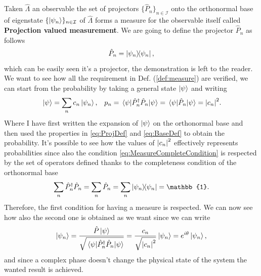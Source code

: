{
    Taken $\hat{\Lambda}$ an observable the set of projectors $\{ \hat{P}_n \}_{n\in\mathcal{I}}$ onto the orthonormal base of eigenstate $\{\ket{\psi_n}\}_{n\in\mathcal{I}}$ of $\hat{\Lambda}$ forms a measure for the observable itself called \textbf{Projection valued measurement}.
}
{
    We are going to define the projector $\hat{P}_n$ as follows
    \begin{equation}
        \hat{P}_n = \ketbra{\psi_n},
    \end{equation}
    which can be easily seen it's a projector, the demonstration is left to the reader. We want to see how all the requirement in Def. (\ref{def:measure}) are verified, we can start from the probability by taking a general state $\ket{\psi}$ and writing
    \begin{align}
        &\ket{\psi} = \sum_n c_n\ket{\psi_n},   & p_n = \ev{\hat{P}^\dagger_n\hat{P}_n}{\psi} = \ev{\hat{P}_n}{\psi} = \abs{c_n}^2.
    \end{align}
    Where I have first written the expansion of $\ket{\psi}$ on the orthonormal base and then used the properties in \eqref{eq:ProjDef} and \eqref{eq:BaseDef} to obtain the probability. It's possible to see how the values of $\abs{c_n}^2$ effectively represents probabilities since also the condition \eqref{eq:MeasureCompleteCondition} is respected by the set of operators defined thanks to the completeness condition of the orthonormal base
    \begin{equation}
        \sum_n \hat{P}^\dagger_n\hat{P}_n = \sum_n \hat{P}_n = \sum_n \ketbra{\psi_n} = \mathbb{1}.
    \end{equation}
    Therefore, the first condition for having a measure is respected. We can now see how also the second one is obtained as we want since we can write
    \begin{equation}
        \ket{\psi_n} = \frac{\hat{P}\ket{\psi}}{\sqrt{\ev{\hat{P}^\dagger_n\hat{P}_n}{\psi}}} = \frac{c_n}{\sqrt{\abs{c_n}^2}}\ket{\psi_n} = e^{i\theta}\ket{\psi_n},
    \end{equation}
    and since a complex phase doesn't change the physical state of the system the wanted result is achieved.
}

